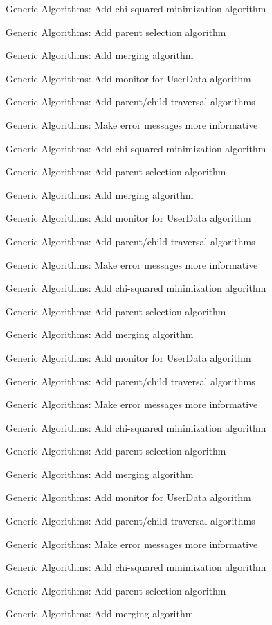 \begin{DoxyRefList}
Generic Algorithms\+: Add chi-\/squared minimization algorithm 

Generic Algorithms\+: Add parent selection algorithm 

Generic Algorithms\+: Add merging algorithm 

Generic Algorithms\+: Add monitor for User\+Data algorithm 

Generic Algorithms\+: Add parent/child traversal algorithms 

Generic Algorithms\+: Make error messages more informative 

Generic Algorithms\+: Add chi-\/squared minimization algorithm 

Generic Algorithms\+: Add parent selection algorithm 

Generic Algorithms\+: Add merging algorithm 

Generic Algorithms\+: Add monitor for User\+Data algorithm 

Generic Algorithms\+: Add parent/child traversal algorithms 

Generic Algorithms\+: Make error messages more informative 

Generic Algorithms\+: Add chi-\/squared minimization algorithm 

Generic Algorithms\+: Add parent selection algorithm 

Generic Algorithms\+: Add merging algorithm 

Generic Algorithms\+: Add monitor for User\+Data algorithm 

Generic Algorithms\+: Add parent/child traversal algorithms 

Generic Algorithms\+: Make error messages more informative 

Generic Algorithms\+: Add chi-\/squared minimization algorithm 

Generic Algorithms\+: Add parent selection algorithm 

Generic Algorithms\+: Add merging algorithm 

Generic Algorithms\+: Add monitor for User\+Data algorithm 

Generic Algorithms\+: Add parent/child traversal algorithms 

Generic Algorithms\+: Make error messages more informative 

Generic Algorithms\+: Add chi-\/squared minimization algorithm 

Generic Algorithms\+: Add parent selection algorithm 

Generic Algorithms\+: Add merging algorithm 


\end{DoxyRefList}
